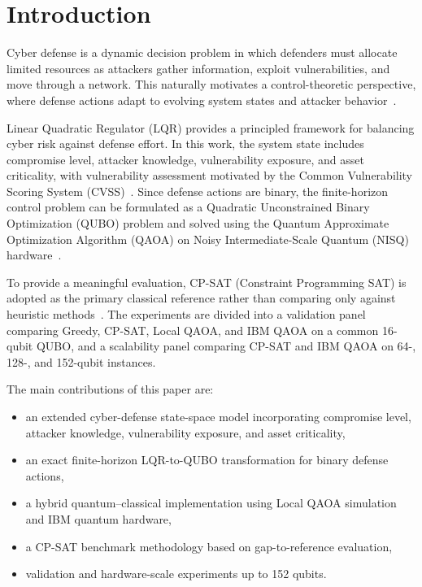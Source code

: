 \documentclass[runningheads]{llncs}
\begin{document}
\section{Introduction}

Cyber defense is a dynamic decision problem in which defenders must allocate limited resources as attackers gather information, exploit vulnerabilities, and move through a network. This naturally motivates a control-theoretic perspective, where defense actions adapt to evolving system states and attacker behavior~\cite{miehling2019control,rasouli2014supervisory,zhu2013game,zhang2025mtd}.

Linear Quadratic Regulator (LQR) provides a principled framework for balancing cyber risk against defense effort. In this work, the system state includes compromise level, attacker knowledge, vulnerability exposure, and asset criticality, with vulnerability assessment motivated by the Common Vulnerability Scoring System (CVSS)~\cite{nistcvss,firstcvss}. Since defense actions are binary, the finite-horizon control problem can be formulated as a Quadratic Unconstrained Binary Optimization (QUBO) problem and solved using the Quantum Approximate Optimization Algorithm (QAOA) on Noisy Intermediate-Scale Quantum (NISQ) hardware~\cite{farhi2014qaoa,cerezo2021variational}.

To provide a meaningful evaluation, CP-SAT (Constraint Programming SAT) is adopted as the primary classical reference rather than comparing only against heuristic methods~\cite{ortoolsdoc,perron2023cpsat,lubinski2024optimization}. The experiments are divided into a validation panel comparing Greedy, CP-SAT, Local QAOA, and IBM QAOA on a common 16-qubit QUBO, and a scalability panel comparing CP-SAT and IBM QAOA on 64-, 128-, and 152-qubit instances.

The main contributions of this paper are:
\begin{itemize}
\item an extended cyber-defense state-space model incorporating compromise level, attacker knowledge, vulnerability exposure, and asset criticality,
\item an exact finite-horizon LQR-to-QUBO transformation for binary defense actions,
\item a hybrid quantum--classical implementation using Local QAOA simulation and IBM quantum hardware,
\item a CP-SAT benchmark methodology based on gap-to-reference evaluation,
\item validation and hardware-scale experiments up to 152 qubits.
\end{itemize}
\end{document}
